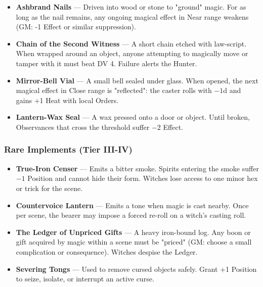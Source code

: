 \documentclass[11pt]{book}
\begin{document}
\begin{itemize}[leftmargin=*]
    \item \textbf{Ashbrand Nails} --- Driven into wood or stone to "ground" magic.  
    For as long as the nail remains, any ongoing magical effect in Near range weakens 
    (GM: -1 Effect or similar suppression).

    \item \textbf{Chain of the Second Witness} --- A short chain etched with law-script.  
    When wrapped around an object, anyone attempting to magically move or tamper with 
    it must beat DV 4.  
    Failure alerts the Hunter.

    \item \textbf{Mirror-Bell Vial} --- A small bell sealed under glass.  
    When opened, the next magical effect in Close range is "reflected":  
    the caster rolls with \(-1\)d and gains +1 Heat with local Orders.

    \item \textbf{Lantern-Wax Seal} --- A wax pressed onto a door or object.  
    Until broken, Observances that cross the threshold suffer \(-2\) Effect.
\end{itemize}

\subsubsection*{Rare Implements (Tier III-IV)}

\begin{itemize}[leftmargin=*]
    \item \textbf{True-Iron Censer} --- Emits a bitter smoke.  
    Spirits entering the smoke suffer \(-1\) Position and cannot hide their form.  
    Witches lose access to one minor hex or trick for the scene.

    \item \textbf{Countervoice Lantern} --- Emits a tone when magic is cast nearby.  
    Once per scene, the bearer may impose a forced re-roll on a witch's casting roll.

    \item \textbf{The Ledger of Unpriced Gifts} --- A heavy iron-bound log.  
    Any boon or gift acquired by magic within a scene must be "priced" (GM: choose 
    a small complication or consequence).  
    Witches despise the Ledger.

    \item \textbf{Severing Tongs} --- Used to remove cursed objects safely.  
    Grant +1 Position to seize, isolate, or interrupt an active curse.
\end{itemize}
\end{document}
